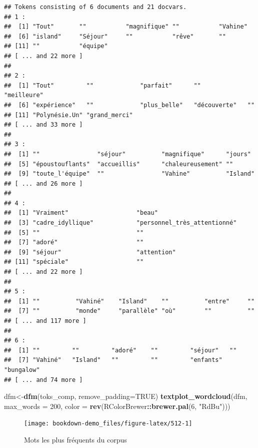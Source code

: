 \documentclass[
]{book}
\newenvironment{Shaded}{\begin{snugshade}}{\end{snugshade}}
\newcommand{\DataTypeTok}[1]{\textcolor[rgb]{0.13,0.29,0.53}{#1}}
\newcommand{\DecValTok}[1]{\textcolor[rgb]{0.00,0.00,0.81}{#1}}
\newcommand{\KeywordTok}[1]{\textcolor[rgb]{0.13,0.29,0.53}{\textbf{#1}}}
\newcommand{\NormalTok}[1]{#1}
\newcommand{\OperatorTok}[1]{\textcolor[rgb]{0.81,0.36,0.00}{\textbf{#1}}}
\newcommand{\OtherTok}[1]{\textcolor[rgb]{0.56,0.35,0.01}{#1}}
\newcommand{\StringTok}[1]{\textcolor[rgb]{0.31,0.60,0.02}{#1}}
\begin{document}
\begin{verbatim}
## Tokens consisting of 6 documents and 21 docvars.
## 1 :
##  [1] "Tout"       ""           "magnifique" ""           "Vahine"    
##  [6] "island"     "Séjour"     ""           "rêve"       ""          
## [11] ""           "équipe"    
## [ ... and 22 more ]
## 
## 2 :
##  [1] "Tout"         ""             "parfait"      ""             "meilleure"   
##  [6] "expérience"   ""             "plus_belle"   "découverte"   ""            
## [11] "Polynésie.Un" "grand_merci" 
## [ ... and 33 more ]
## 
## 3 :
##  [1] ""                "séjour"          "magnifique"      "jours"          
##  [5] "époustouflants"  "accueillis"      "chaleureusement" ""               
##  [9] "toute_l'équipe"  ""                "Vahine"          "Island"         
## [ ... and 26 more ]
## 
## 4 :
##  [1] "Vraiment"                   "beau"                      
##  [3] "cadre_idyllique"            "personnel_très_attentionné"
##  [5] ""                           ""                          
##  [7] "adoré"                      ""                          
##  [9] "séjour"                     "attention"                 
## [11] "spéciale"                   ""                          
## [ ... and 22 more ]
## 
## 5 :
##  [1] ""          "Vahiné"    "Island"    ""          "entre"     ""         
##  [7] ""          "monde"     "parallèle" "où"        ""          ""         
## [ ... and 117 more ]
## 
## 6 :
##  [1] ""         ""         "adoré"    ""         "séjour"   ""        
##  [7] "Vahiné"   "Island"   ""         ""         "enfants"  "bungalow"
## [ ... and 74 more ]
\end{verbatim}

\begin{Shaded}
\begin{Highlighting}[]
\NormalTok{dfm<-}\KeywordTok{dfm}\NormalTok{(toks_comp, }\DataTypeTok{remove_padding=}\OtherTok{TRUE}\NormalTok{)}
\KeywordTok{textplot_wordcloud}\NormalTok{(dfm, }\DataTypeTok{max_words =} \DecValTok{200}\NormalTok{, }\DataTypeTok{color =} \KeywordTok{rev}\NormalTok{(RColorBrewer}\OperatorTok{::}\KeywordTok{brewer.pal}\NormalTok{(}\DecValTok{6}\NormalTok{, }\StringTok{"RdBu"}\NormalTok{)))}
\end{Highlighting}
\end{Shaded}

\begin{figure}

{\centering \texttt{[image: bookdown-demo\_files/figure-latex/512-1]} 

}

\caption{Mots les plus fréquents du corpus}\label{fig:512}
\end{figure}
\end{document}
